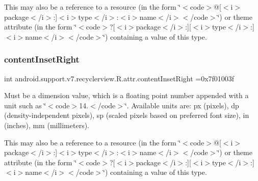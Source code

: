 This may also be a reference to a resource (in the form \char`\"{}$<$code$>$@\mbox{[}$<$i$>$package$<$/i$>$\+:\mbox{]}$<$i$>$type$<$/i$>$\+:$<$i$>$name$<$/i$>$$<$/code$>$\char`\"{}) or theme attribute (in the form \char`\"{}$<$code$>$?\mbox{[}$<$i$>$package$<$/i$>$\+:\mbox{]}\mbox{[}$<$i$>$type$<$/i$>$\+:\mbox{]}$<$i$>$name$<$/i$>$$<$/code$>$\char`\"{}) containing a value of this type. \mbox{\label{classandroid_1_1support_1_1v7_1_1recyclerview_1_1R_1_1attr_a3496651078a82f9d2db8bd0bac943866}} 
\subsubsection{\texorpdfstring{content\+Inset\+Right}{contentInsetRight}}
{\footnotesize\ttfamily int android.\+support.\+v7.\+recyclerview.\+R.\+attr.\+content\+Inset\+Right =0x7f01003f\hspace{0.3cm}{\ttfamily [static]}}

Must be a dimension value, which is a floating point number appended with a unit such as \char`\"{}$<$code$>$14.\+5sp$<$/code$>$\char`\"{}. Available units are\+: px (pixels), dp (density-\/independent pixels), sp (scaled pixels based on preferred font size), in (inches), mm (millimeters). 

This may also be a reference to a resource (in the form \char`\"{}$<$code$>$@\mbox{[}$<$i$>$package$<$/i$>$\+:\mbox{]}$<$i$>$type$<$/i$>$\+:$<$i$>$name$<$/i$>$$<$/code$>$\char`\"{}) or theme attribute (in the form \char`\"{}$<$code$>$?\mbox{[}$<$i$>$package$<$/i$>$\+:\mbox{]}\mbox{[}$<$i$>$type$<$/i$>$\+:\mbox{]}$<$i$>$name$<$/i$>$$<$/code$>$\char`\"{}) containing a value of this type. \mbox{\label{classandroid_1_1support_1_1v7_1_1recyclerview_1_1R_1_1attr_a61c7b9100bb36195d7ad5a2ea90586b6}} 
